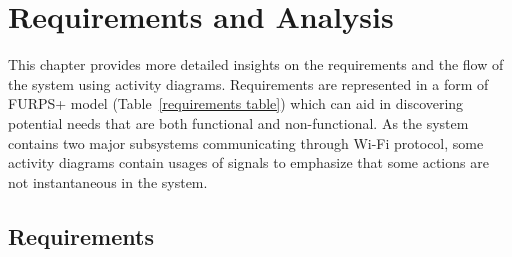 \chapter{Requirements and Analysis}
\label{Requirement and Analysis}
This chapter provides more detailed insights on the requirements and the flow of the system using activity diagrams. Requirements are represented in a form of FURPS+ model (Table~\ref{requirements table}) which can aid in discovering potential needs that are both functional and non-functional. As the system contains two major subsystems communicating through Wi-Fi protocol, some activity diagrams contain usages of signals to emphasize that some actions are not instantaneous in the system.

\section{Requirements}
